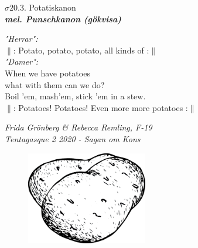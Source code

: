 \documentclass[a6paper,10pt]{article}
\newcommand{\mel}[1]{\small\textbf{\textit{mel. #1 \\}}}
\begin{document}
\begin{center}
\Large $\sigma20.3$. Potatiskanon\\
\mel{Punschkanon (gökvisa)} 
\end{center}
\textit{"Herrar":}
\vspace{3pt}\\
$\|$: Potato, potato, potato, all kinds of :$\|$
\vspace{5pt}\\
\textit{"Damer":}
\vspace{3pt}\\
When we have potatoes\\
what with them can we do?\\
Boil ’em, mash’em, stick ’em in a stew.
\vspace{5pt}\\
$\|$: Potatoes! Potatoes! Even more more potatoes  :$\|$
\begin{flushright}
\textit{Frida Grönberg \& Rebecca Remling, F-19 \\Tentagasque 2 2020 - Sagan om Kons}
\end{flushright}

\vspace{20pt}
\begin{figure}[h!]
\begin{center}
\includegraphics[width=150pt]{potatiskanon}
\end{center}
\end{figure}

\setlength{\oddsidemargin}{-0.47in}
\end{document}
